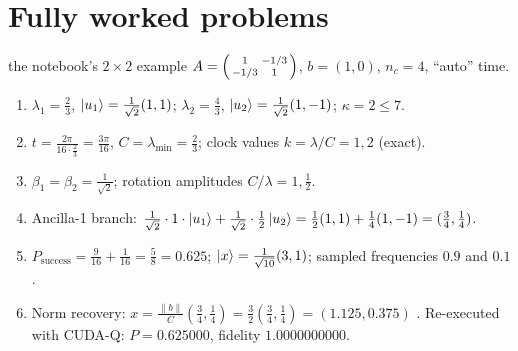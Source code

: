 \documentclass[11pt,a4paper,openany]{book}
\newcounter{wex}[chapter]
\newenvironment{steps}{\begin{enumerate}[label=\textbf{Step \arabic*.}, leftmargin=4.2em, itemsep=2pt]}{\end{enumerate}}
\begin{document}
\section{Fully worked problems}
\begin{wexample}{the notebook's $2\times2$ example}
$A = \begin{psmallmatrix}1&-1/3\\-1/3&1\end{psmallmatrix}$, $b = (1, 0)$, $n_c = 4$, ``auto'' time.
\begin{steps}
\item $\lambda_1 = \frac23$, $\ket{u_1} = \frac{1}{\sqrt2}(1, 1)$; $\lambda_2 = \frac43$, $\ket{u_2} = \frac{1}{\sqrt2}(1, -1)$; $\kappa = 2 \le 7$.
\item $t = \frac{2\pi}{16\cdot\frac23} = \frac{3\pi}{16}$, $C = \lambda_{\min} = \frac23$; clock values $k = \lambda/C = 1, 2$ (exact).
\item $\beta_1 = \beta_2 = \frac{1}{\sqrt2}$; rotation amplitudes $C/\lambda = 1, \frac12$.
\item Ancilla-1 branch: $\frac{1}{\sqrt2}\cdot1\cdot\ket{u_1} + \frac{1}{\sqrt2}\cdot\frac12\ket{u_2} = \frac12(1, 1) + \frac14(1, -1) = (\frac34, \frac14)$.
\item $P_{\text{success}} = \frac9{16} + \frac1{16} = \frac58 = 0.625$; $\ket x = \frac{1}{\sqrt{10}}(3, 1)$; sampled frequencies $0.9$ and $0.1$.
\item Norm recovery: $x = \frac{\|b\|}{C}(\frac34, \frac14) = \frac32(\frac34, \frac14) = (1.125, 0.375)$ \checkmark. Re-executed with CUDA-Q: $P = 0.625000$, fidelity $1.0000000000$.
\end{steps}
\end{wexample}
\end{document}

